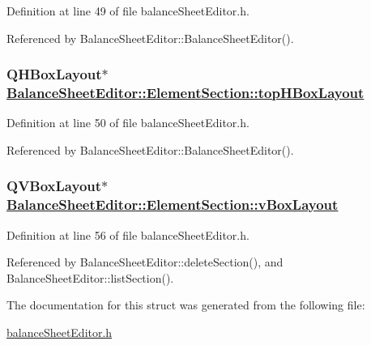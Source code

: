 Definition at line 49 of file balance\-Sheet\-Editor.h.

Referenced by Balance\-Sheet\-Editor::Balance\-Sheet\-Editor().\hypertarget{structBalanceSheetEditor_1_1ElementSection_o1}{
\subsubsection[topHBoxLayout]{\setlength{\rightskip}{0pt plus 5cm}QHBox\-Layout$\ast$ \hyperlink{structBalanceSheetEditor_1_1ElementSection_o1}{Balance\-Sheet\-Editor::Element\-Section::top\-HBox\-Layout}}}
\label{structBalanceSheetEditor_1_1ElementSection_o1}


Definition at line 50 of file balance\-Sheet\-Editor.h.

Referenced by Balance\-Sheet\-Editor::Balance\-Sheet\-Editor().\hypertarget{structBalanceSheetEditor_1_1ElementSection_o7}{
\subsubsection[vBoxLayout]{\setlength{\rightskip}{0pt plus 5cm}QVBox\-Layout$\ast$ \hyperlink{structBalanceSheetEditor_1_1ElementSection_o7}{Balance\-Sheet\-Editor::Element\-Section::v\-Box\-Layout}}}
\label{structBalanceSheetEditor_1_1ElementSection_o7}


Definition at line 56 of file balance\-Sheet\-Editor.h.

Referenced by Balance\-Sheet\-Editor::delete\-Section(), and Balance\-Sheet\-Editor::list\-Section().

The documentation for this struct was generated from the following file:\begin{CompactItemize}
\item 
\hyperlink{balanceSheetEditor_8h}{balance\-Sheet\-Editor.h}\end{CompactItemize}
